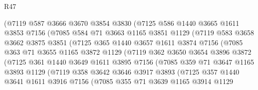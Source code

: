 \begin{lexlean}{R47}
\begin{coremodule}
              (@7119
                @587
                @3666
                @3670
                @3854
                @3830
                (@7125
                  @586
                  @1440
                  @3665
                  @1611
                  @3853
                  @7156
                  (@7085
                    @584
                    @71
                    @3663
                    @1165
                    @3851
                    @1129
                    (@7119
                      @583
                      @3658
                      @3662
                      @3875
                      @3851
                      (@7125
                        @365
                        @1440
                        @3657
                        @1611
                        @3874
                        @7156
                        (@7085
                          @363
                          @71
                          @3655
                          @1165
                          @3872
                          @1129
                          (@7119
                            @362
                            @3650
                            @3654
                            @3896
                            @3872
                            (@7125
                              @361
                              @1440
                              @3649
                              @1611
                              @3895
                              @7156
                              (@7085
                                @359
                                @71
                                @3647
                                @1165
                                @3893
                                @1129
                                (@7119
                                  @358
                                  @3642
                                  @3646
                                  @3917
                                  @3893
                                  (@7125
                                    @357
                                    @1440
                                    @3641
                                    @1611
                                    @3916
                                    @7156
                                    (@7085
                                      @355
                                      @71
                                      @3639
                                      @1165
                                      @3914
                                      @1129

\end{coremodule}
\end{lexlean}

